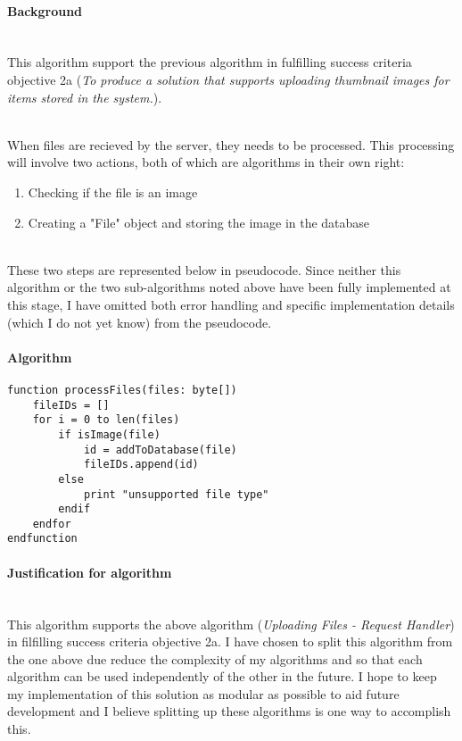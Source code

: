 \documentclass[../../main.tex]{subfiles}
\begin{document}
\paragraph{Background}

\noindent \\ This algorithm support the previous algorithm in fulfilling success criteria objective 2a
(\textit{To produce a solution that supports uploading thumbnail images for items stored in the system.}).

\noindent \\ When files are recieved by the server, they needs to be processed. This processing will involve
two actions, both of which are algorithms in their own right:

\begin{enumerate}
    \item Checking if the file is an image
    \item Creating a "File" object and storing the image in the database
\end{enumerate}

\noindent \\ These two steps are represented below in pseudocode.
Since neither this algorithm or the two sub-algorithms noted above have been fully implemented at this stage,
I have omitted both error handling and specific implementation details (which I do not yet know) from the
pseudocode.

\paragraph{Algorithm\\}

\begin{lstlisting}
function processFiles(files: byte[])
    fileIDs = []
    for i = 0 to len(files)
        if isImage(file)
            id = addToDatabase(file)
            fileIDs.append(id)
        else
            print "unsupported file type"
        endif
    endfor
endfunction
\end{lstlisting}

\paragraph{Justification for algorithm}

\noindent \\ This algorithm supports the above algorithm (\textit{Uploading Files - Request Handler}) in
filfilling success criteria objective 2a. I have chosen to split this algorithm from the one above due reduce
the complexity of my algorithms and so that each algorithm can be used independently of the other in the future.
I hope to keep my implementation of this solution as modular as possible to aid future development and I believe
splitting up these algorithms is one way to accomplish this.
\end{document}
